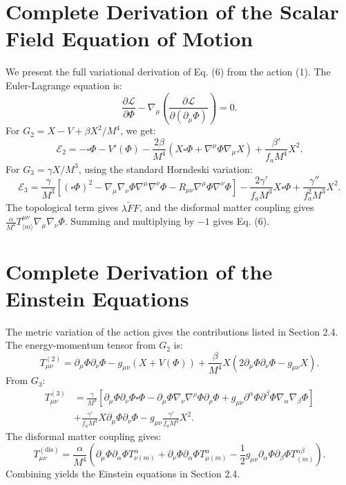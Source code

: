 \documentclass[11pt,a4paper]{article}
\begin{document}
\section{Complete Derivation of the Scalar Field Equation of Motion}
We present the full variational derivation of Eq. (6) from the action (1). The Euler-Lagrange equation is:
\begin{equation}
\frac{\partial\mathcal{L}}{\partial\Phi} -\nabla_{\mu}\left(\frac{\partial\mathcal{L}}{\partial(\partial_{\mu}\Phi)}\right) = 0. \tag{72}
\end{equation}
For \(G_{2} = X - V + \beta X^{2} / M^{4}\), we get:
\begin{equation}
\mathcal{E}_2 = -\square \Phi -V'(\Phi) - \frac{2\beta}{M^4} (X\square \Phi +\nabla^\mu \Phi \nabla_\mu X) + \frac{\beta'}{f_aM^4} X^2. \tag{73}
\end{equation}
For \(G_{3} = \gamma X / M^{3}\), using the standard Horndeski variation:
\begin{equation}
\mathcal{E}_3 = \frac{\gamma}{M^3}\left[(\square \Phi)^2 -\nabla_\mu \nabla_\nu \Phi \nabla^\mu \nabla^\nu \Phi -R_{\mu \nu}\nabla^\mu \Phi \nabla^\nu \Phi \right] - \frac{2\gamma'}{f_aM^3} X\square \Phi +\frac{\gamma''}{f_a^2M^3} X^2. \tag{74}
\end{equation}
The topological term gives \(\lambda \tilde{F} F\), and the disformal matter coupling gives \(\frac{\alpha}{M^4} T_{\langle m\rangle}^{\mu \nu}\nabla_{\mu}\nabla_{\nu}\Phi\). Summing and multiplying by \(-1\) gives Eq. (6).

\section{Complete Derivation of the Einstein Equations}
The metric variation of the action gives the contributions listed in Section 2.4. The energy-momentum tensor from \(G_{2}\) is:
\begin{equation}
T_{\mu \nu}^{(2)} = \partial_{\mu}\Phi \partial_{\nu}\Phi -g_{\mu \nu}(X + V(\Phi)) + \frac{\beta}{M^4} X(2\partial_{\mu}\Phi \partial_{\nu}\Phi -g_{\mu \nu}X). \tag{75}
\end{equation}
From \(G_{3}\):
\begin{align}
T_{\mu \nu}^{(3)} &= \frac{\gamma}{M^3}\left[\partial_{\mu}\Phi \partial_{\nu}\Phi \square \Phi -\partial_{\mu}\Phi \nabla_{\nu}\nabla^{\rho}\Phi \partial_{\rho}\Phi +g_{\mu \nu}\partial^{\alpha}\Phi \partial^{\beta}\Phi \nabla_{\alpha}\nabla_{\beta}\Phi \right] \nonumber\\
&+ \frac{\gamma'}{f_{a}M^3} X\partial_{\mu}\Phi \partial_{\nu}\Phi -g_{\mu \nu}\frac{\gamma'}{f_{a}M^3} X^2. \tag{76}
\end{align}
The disformal matter coupling gives:
\begin{equation}
T_{\mu \nu}^{(\mathrm{dis})} = \frac{\alpha}{M^4}\left(\partial_{\mu}\Phi \partial_{\alpha}\Phi T_{\nu (m)}^{\alpha} + \partial_{\nu}\Phi \partial_{\alpha}\Phi T_{\mu (m)}^{\alpha} - \frac{1}{2} g_{\mu \nu}\partial_{\alpha}\Phi \partial_{\beta}\Phi T_{(m)}^{\alpha \beta}\right). \tag{77}
\end{equation}
Combining yields the Einstein equations in Section 2.4.
\end{document}

